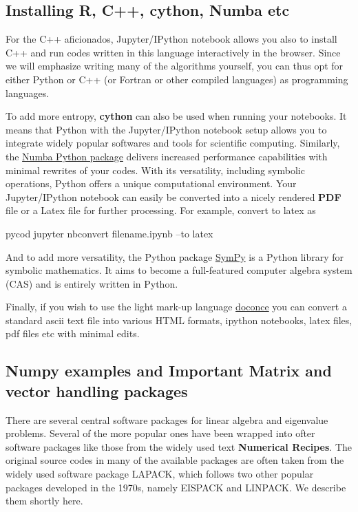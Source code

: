 \documentclass[%
oneside,                 %
final,                   %
10pt]{article}
\begin{document}
\subsection{Installing R, C++, cython, Numba etc}


For the C++ aficionados, Jupyter/IPython notebook allows you also to
install C++ and run codes written in this language interactively in
the browser. Since we will emphasize writing many of the algorithms
yourself, you can thus opt for either Python or C++ (or Fortran or other compiled languages) as programming
languages.

To add more entropy, \textbf{cython} can also be used when running your
notebooks. It means that Python with the Jupyter/IPython notebook
setup allows you to integrate widely popular softwares and tools for
scientific computing. Similarly, the 
\href{{https://numba.pydata.org/}}{Numba Python package} delivers increased performance
capabilities with minimal rewrites of your codes.  With its
versatility, including symbolic operations, Python offers a unique
computational environment. Your Jupyter/IPython notebook can easily be
converted into a nicely rendered \textbf{PDF} file or a Latex file for
further processing. For example, convert to latex as 

\bccq
pycod jupyter nbconvert filename.ipynb --to latex 
\eccq

And to add more versatility, the Python package \href{{http://www.sympy.org/en/index.html}}{SymPy} is a Python library for symbolic mathematics. It aims to become a full-featured computer algebra system (CAS)  and is entirely written in Python. 

Finally, if you wish to use the light mark-up language 
\href{{https://github.com/hplgit/doconce}}{doconce} you can convert a standard ascii text file into various HTML 
formats, ipython notebooks, latex files, pdf files etc with minimal edits.



\subsection{Numpy examples and Important Matrix and vector handling packages}

There are several central software packages for linear algebra and eigenvalue problems. Several of the more
popular ones have been wrapped into ofter software packages like those from the widely used text \textbf{Numerical Recipes}. The original source codes in many of the available packages are often taken from the widely used
software package LAPACK, which follows two other popular packages
developed in the 1970s, namely EISPACK and LINPACK.  We describe them shortly here.
\end{document}

